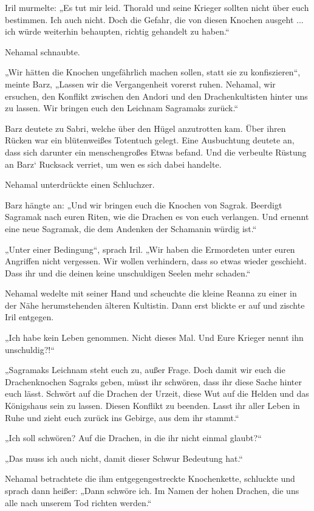 Iril murmelte: „Es tut mir leid. Thorald und seine Krieger sollten nicht über euch bestimmen. Ich auch nicht. Doch die Gefahr, die von diesen Knochen ausgeht ... ich würde weiterhin behaupten, richtig gehandelt zu haben.“

Nehamal schnaubte.

„Wir hätten die Knochen ungefährlich machen sollen, statt sie zu konfiszieren“, meinte Barz, „Lassen wir die Vergangenheit vorerst ruhen. Nehamal, wir ersuchen, den Konflikt zwischen den Andori und den Drachenkultisten hinter uns zu lassen. Wir bringen euch den Leichnam Sagramaks zurück.“

Barz deutete zu Sabri, welche über den Hügel anzutrotten kam. Über ihren Rücken war ein blütenweißes Totentuch gelegt. Eine Ausbuchtung deutete an, dass sich darunter ein menschengroßes Etwas befand. Und die verbeulte Rüstung an Barz‘ Rucksack verriet, um wen es sich dabei handelte.

Nehamal unterdrückte einen Schluchzer.

Barz hängte an: „Und wir bringen euch die Knochen von Sagrak. Beerdigt Sagramak nach euren Riten, wie die Drachen es von euch verlangen. Und ernennt eine neue Sagramak, die dem Andenken der Schamanin würdig ist.“

„Unter einer Bedingung“, sprach Iril. „Wir haben die Ermordeten unter euren Angriffen nicht vergessen. Wir wollen verhindern, dass so etwas wieder geschieht. Dass ihr und die deinen keine unschuldigen Seelen mehr schaden.“

Nehamal wedelte mit seiner Hand und scheuchte die kleine Reanna zu einer in der Nähe herumstehenden älteren Kultistin. Dann erst blickte er auf und zischte Iril entgegen.

„Ich habe kein Leben genommen. Nicht dieses Mal. Und Eure Krieger nennt ihn unschuldig?!“

„Sagramaks Leichnam steht euch zu, außer Frage. Doch damit wir euch die Drachenknochen Sagraks geben, müsst ihr schwören, dass ihr diese Sache hinter euch lässt. Schwört auf die Drachen der Urzeit, diese Wut auf die Helden und das Königshaus sein zu lassen. Diesen Konflikt zu beenden. Lasst ihr aller Leben in Ruhe und zieht euch zurück ins Gebirge, aus dem ihr stammt.“

„Ich soll schwören? Auf die Drachen, in die ihr nicht einmal glaubt?“

„Das muss ich auch nicht, damit dieser Schwur Bedeutung hat.“

Nehamal betrachtete die ihm entgegengestreckte Knochenkette, schluckte und sprach dann heißer: „Dann schwöre ich. Im Namen der hohen Drachen, die uns alle nach unserem Tod richten werden.“

